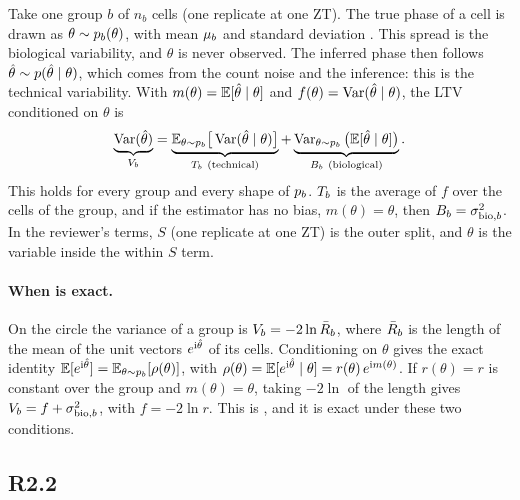 Take one group $b$ of $n_b$ cells (one replicate at one ZT). The true phase of a cell is drawn as $\theta \sim p_b(\theta)$, with mean $\mu_b$ and standard deviation \sbiob. This spread is the biological variability, and $\theta$ is never observed. The inferred phase then follows $\hat\theta \sim p(\hat\theta \mid \theta)$, which comes from the count noise and the inference: this is the technical variability. With $m(\theta) = \mathbb{E}[\hat\theta \mid \theta]$ and $f(\theta) = \operatorname{Var}(\hat\theta \mid \theta)$, the LTV conditioned on $\theta$ is
\begin{equation}
\underbrace{\operatorname{Var}(\hat\theta)}_{V_b}
= \underbrace{\mathbb{E}_{\theta \sim p_b}\big[\operatorname{Var}(\hat\theta \mid \theta)\big]}_{T_b\ \text{(technical)}}
+ \underbrace{\operatorname{Var}_{\theta \sim p_b}\big(\mathbb{E}[\hat\theta \mid \theta]\big)}_{B_b\ \text{(biological)}} .
\label{eq:ltv}
\end{equation}
This holds for every group and every shape of $p_b$. $T_b$ is the average of $f$ over the cells of the group, and if the estimator has no bias, $m(\theta) = \theta$, then $B_b = \sigma_{\text{bio},b}^2$. In the reviewer's terms, $S$ (one replicate at one ZT) is the outer split, and $\theta$ is the variable inside the within $S$ term.

\paragraph{When  is exact.}

On the circle the variance of a group is $V_b = -2\ln \bar R_b$, where $\bar R_b$ is the length of the mean of the unit vectors $e^{\mathrm{i}\hat\theta}$ of its cells. Conditioning on $\theta$ gives the exact identity $\mathbb{E}[e^{\mathrm{i}\hat\theta}] = \mathbb{E}_{\theta \sim p_b}[\rho(\theta)]$, with $\rho(\theta) = \mathbb{E}[e^{\mathrm{i}\hat\theta} \mid \theta] = r(\theta)\, e^{\mathrm{i} m(\theta)}$. If $r(\theta) = r$ is constant over the group and $m(\theta) = \theta$, taking $-2\ln$ of the length gives $V_b = f + \sigma_{\text{bio},b}^2$, with $f = -2\ln r$. This is , and it is exact under these two conditions.


\subsection*{R2.2}


